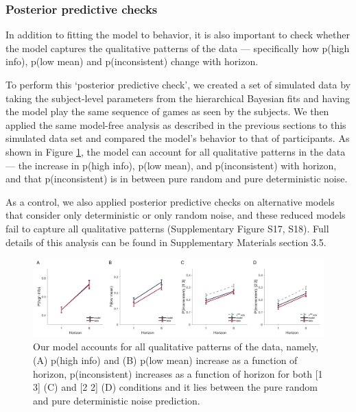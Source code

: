 \documentclass[12pt]{article}
\begin{document}
{\subsubsection*{Posterior predictive checks}
In addition to fitting the model to behavior, it is also important to check whether the model captures the qualitative patterns of the data \citep{Wilson2019, Palminteri} --- specifically how p(high info), p(low mean) and p(inconsistent) change with horizon.

To perform this `posterior predictive check', we created a set of simulated data by taking the subject-level parameters from the hierarchical Bayesian fits and having the model play the same sequence of games as seen by the subjects. We then applied the same model-free analysis as described in the previous sections to this simulated data set and compared the model's behavior to that of participants. As shown in Figure \ref{fig:mb3}, the model can account for all qualitative patterns in the data --- the increase in p(high info), p(low mean), and p(inconsistent) with horizon, and that p(inconsistent) is in between pure random and pure deterministic noise. 

As a control, we also applied posterior predictive checks on alternative models that consider only deterministic or only random noise, and these reduced models fail to capture all qualitative patterns (Supplementary Figure S17, S18). Full details of this analysis can be found in Supplementary Materials section 3.5.  

\begin{figure}[H]
\begin{center}
	\includegraphics[width=1\textwidth]{figures/RDBayes_2noise_modelA.jpg}
	\caption{
		Our model accounts for all qualitative patterns of the data, namely, (A) p(high info) and (B) p(low mean) increase as a function of horizon, p(inconsistent) increases as a function of horizon for both [1 3] (C) and [2 2] (D) conditions and it lies between the pure random and pure deterministic noise prediction.}
	\label{fig:mb3}
\end{center}
\end{figure}


}
\end{document}
